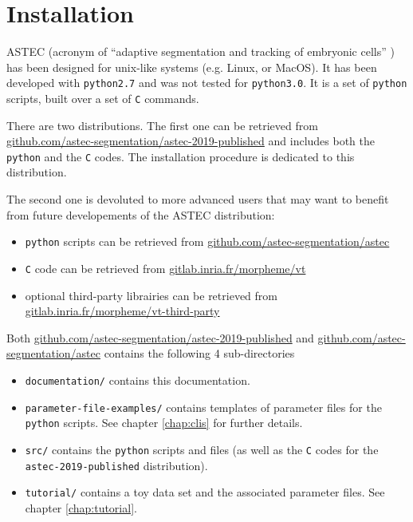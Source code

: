
\chapter{Installation}

ASTEC (acronym of ``adaptive segmentation and tracking of embryonic
cells'' \cite{guignard:tel-01278725}) has been designed for unix-like
systems (e.g. Linux, or MacOS).
%
It has been developed with \texttt{python2.7} and was not tested for
\texttt{python3.0}.
%
It is a set of \texttt{python} scripts, built over a set of \texttt{C} commands.


There are two distributions. The first one can be retrieved from
\url{github.com/astec-segmentation/astec-2019-published} and includes
both the \texttt{python} and the \texttt{C} codes. The installation
procedure is dedicated to this distribution.

The second one is devoluted to more advanced users that may want to
benefit from future developements of the ASTEC distribution:
\begin{itemize}
\itemsep -0.5ex
\item \texttt{python} scripts can be retrieved from
  \url{github.com/astec-segmentation/astec}
\item \texttt{C} code can be retrieved from
  \url{gitlab.inria.fr/morpheme/vt}
\item optional third-party librairies can be retrieved from  \url{gitlab.inria.fr/morpheme/vt-third-party}
\end{itemize}  

Both \url{github.com/astec-segmentation/astec-2019-published} and
\url{github.com/astec-segmentation/astec} contains the following 4
sub-directories

\mbox{}
\mbox{}

\begin{itemize}
\itemsep -0.5ex
\item \texttt{documentation/} contains this documentation.
\item \texttt{parameter-file-examples/} contains templates of
  parameter files for the \texttt{python} scripts. See chapter
  \ref{chap:clis} for further details.
\item \texttt{src/} contains the \texttt{python} scripts and files (as
  well as the \texttt{C} codes for the \texttt{astec-2019-published} distribution).
\item \texttt{tutorial/} contains a toy data set and the associated
  parameter files. See chapter \ref{chap:tutorial}.
\end{itemize}  


